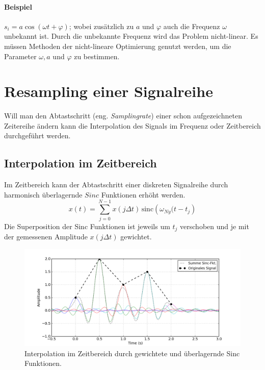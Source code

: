 \begin{enumerate}
\paragraph{Beispiel} $s_i=a \cos(\omega t + \varphi)$; wobei zusätzlich zu $a$ und $\varphi$ auch die Frequenz $\omega$ unbekannt ist. Durch die unbekannte Frequenz wird das Problem nicht-linear. Es müssen Methoden der nicht-lineare Optimierung genutzt werden, um die Parameter $\omega, a$ und $\varphi$ zu bestimmen.
\end{enumerate}

\section{Resampling einer Signalreihe}
Will man den Abtastschritt (eng. \textsl{Samplingrate}) einer schon aufgezeichneten Zeitereihe ändern kann die Interpolation des Signals im Frequenz oder Zeitbereich durchgeführt werden.

\subsection{Interpolation im Zeitbereich}
Im Zeitbereich kann der Abtastschritt einer diskreten Signalreihe durch harmonisch überlagernde $Sinc$ Funktionen erhöht werden.
\begin{equation}
x(t) = \sum_{j=0}^{N-1} x(j \Delta t) \, \mbox{sinc} \left(\omega_{Ny}(t-{t_j}\right)
\end{equation}
Die Superposition der Sinc Funktionen ist jeweils um $t_j$ verschoben und je mit der gemessenen Amplitude $x(j\Delta t)$ gewichtet.

\begin{figure}[h!]
\centering
\includegraphics[width=.9\tw]{fig/04-Daten/interpolation_sinc.png}
\caption{Interpolation im Zeitbereich durch gewichtete und überlagernde Sinc Funktionen.}
\end{figure}
